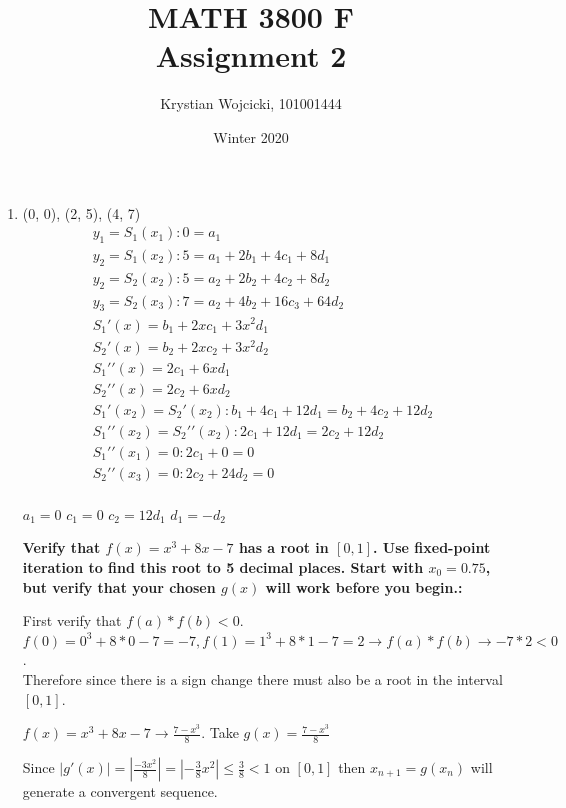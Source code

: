 \documentclass{article}
\title{MATH 3800 F\\
	\large{Assignment 2}}
\author{Krystian Wojcicki, 101001444}
\date{Winter 2020}
\begin{document}
\maketitle

\begin{enumerate}[1.]
\item


(0, 0), (2, 5), (4, 7)
\begin{gather*}
y_1 = S_1(x_1) : 0 = a_1 \\
y_2 = S_1(x_2) : 5 = a_1 + 2b_1 + 4c_1 + 8d_1 \\
y_2 = S_2(x_2) : 5 = a_2 + 2b_2 + 4c_2 + 8d_2 \\
y_3 = S_2(x_3) : 7 = a_2 + 4b_2 + 16c_3 + 64d_2 \\
S_1\prime(x) = b_1 + 2xc_1 + 3x^2d_1 \\
S_2\prime(x) = b_2 + 2xc_2 + 3x^2d_2 \\
S_1\prime\prime(x) = 2c_1 + 6xd_1 \\
S_2\prime\prime(x) = 2c_2 + 6xd_2 \\
S_1\prime(x_2)  = S_2\prime(x_2):  b_1 + 4c_1 + 12d_1 = b_2 + 4c_2 + 12d_2\\
S_1\prime\prime(x_2) = S_2\prime\prime(x_2) : 2c_1 + 12d_1 = 2c_2 + 12d_2\\
S_1\prime\prime(x_1) = 0 : 2c_1 + 0 = 0 \\
S_2\prime\prime(x_3) = 0 : 2c_2 + 24d_2 = 0 \\
\end{gather*}

$a_1 = 0$
$c_1 = 0$
$c_2 = 12d_1$
$d_1 = -d_2$






\textbf{Verify that $f(x) = x^3 +8x - 7$ has a root in $[0,1]$.  Use fixed-point iteration to find this
root to 5 decimal places. Start with $x_0 = 0.75$, but verify that your chosen $g(x)$ will work
before you begin.:}

First verify that $f(a) * f(b) < 0$. \\
$f(0) = 0^3 + 8 * 0 - 7 = -7, f(1) = 1^3 + 8 * 1- 7 = 2 \to f(a) * f(b) \to -7 * 2 < 0$. \\
Therefore since there is a sign change there must also be a root in the interval $[0,1]$.

$f(x) = x^3 + 8x - 7 \to \frac{7 - x^3}{8}$. Take $g(x) = \frac{7 - x^3}{8}$

Since $|g\prime(x)| = |\frac{-3x^2}{8}| = |-\frac{3}{8}x^2|  \leq \frac{3}{8} < 1$ on $[0,1]$ then $x_{n+1} = g(x_n)$ will generate a convergent sequence.


\end{enumerate}
\end{document}
